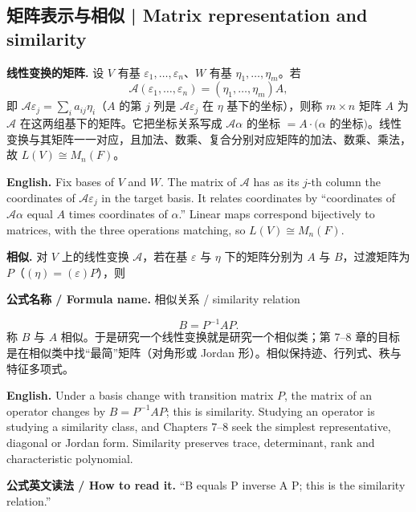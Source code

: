 \documentclass[UTF8,11pt,a4paper]{ctexart}
\newcommand{\EN}[1]{\par\noindent\textbf{English.} #1\par}
\newcommand{\READ}[1]{\par\noindent\textbf{公式英文读法 / How to read it.} #1\par}
\newcommand{\FORMULA}[2]{\par\noindent\textbf{公式名称 / Formula name.} #1 / #2\par}
\begin{document}
\subsection{矩阵表示与相似 | Matrix representation and similarity}
\noindent\textbf{线性变换的矩阵.} 设 $V$ 有基 $\varepsilon_1,\dots,\varepsilon_n$、$W$ 有基 $\eta_1,\dots,\eta_m$。若
\[
\mathcal A(\varepsilon_1,\dots,\varepsilon_n)=(\eta_1,\dots,\eta_m)A,
\]
即 $\mathcal A\varepsilon_j=\sum_i a_{ij}\eta_i$（$A$ 的第 $j$ 列是 $\mathcal A\varepsilon_j$ 在 $\eta$ 基下的坐标），则称 $m\times n$ 矩阵 $A$ 为 $\mathcal A$ 在这两组基下的矩阵。它把坐标关系写成 $\mathcal A\alpha$ 的坐标 $=A\cdot(\alpha$ 的坐标$)$。线性变换与其矩阵一一对应，且加法、数乘、复合分别对应矩阵的加法、数乘、乘法，故 $L(V)\cong M_n(F)$。
\EN{Fix bases of $V$ and $W$. The matrix of $\mathcal A$ has as its $j$-th column the coordinates of $\mathcal A\varepsilon_j$ in the target basis. It relates coordinates by ``coordinates of $\mathcal A\alpha$ equal $A$ times coordinates of $\alpha$.'' Linear maps correspond bijectively to matrices, with the three operations matching, so $L(V)\cong M_n(F)$.}
\noindent\textbf{相似.} 对 $V$ 上的线性变换 $\mathcal A$，若在基 $\varepsilon$ 与 $\eta$ 下的矩阵分别为 $A$ 与 $B$，过渡矩阵为 $P$（$(\eta)=(\varepsilon)P$），则
\FORMULA{相似关系}{similarity relation}
\[
B=P^{-1}AP.
\]
称 $B$ 与 $A$ 相似。于是研究一个线性变换就是研究一个相似类；第 7--8 章的目标是在相似类中找“最简”矩阵（对角形或 Jordan 形）。相似保持迹、行列式、秩与特征多项式。
\EN{Under a basis change with transition matrix $P$, the matrix of an operator changes by $B=P^{-1}AP$; this is similarity. Studying an operator is studying a similarity class, and Chapters 7--8 seek the simplest representative, diagonal or Jordan form. Similarity preserves trace, determinant, rank and characteristic polynomial.}
\READ{``B equals P inverse A P; this is the similarity relation.''}
\end{document}
